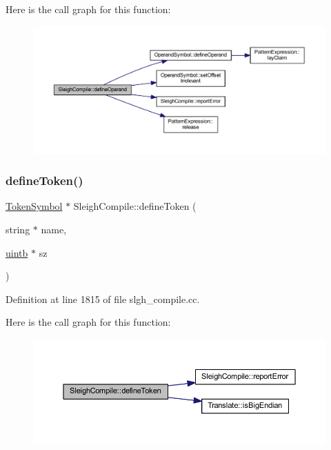 Here is the call graph for this function\+:
\nopagebreak
\begin{figure}[H]
\begin{center}
\leavevmode
\includegraphics[width=350pt]{class_sleigh_compile_a13ca459265a60fa719375491070a378c_cgraph}
\end{center}
\end{figure}
\mbox{\label{class_sleigh_compile_a3853fde5e5b1777fc03c8780ff9bdeaa}} 
\subsubsection{\texorpdfstring{defineToken()}{defineToken()}}
{\footnotesize\ttfamily \mbox{\hyperlink{class_token_symbol}{Token\+Symbol}} $\ast$ Sleigh\+Compile\+::define\+Token (\begin{DoxyParamCaption}\item[{string $\ast$}]{name,  }\item[{\mbox{\hyperlink{types_8h_a2db313c5d32a12b01d26ac9b3bca178f}{uintb}} $\ast$}]{sz }\end{DoxyParamCaption})}



Definition at line 1815 of file slgh\+\_\+compile.\+cc.

Here is the call graph for this function\+:
\nopagebreak
\begin{figure}[H]
\begin{center}
\leavevmode
\includegraphics[width=350pt]{class_sleigh_compile_a3853fde5e5b1777fc03c8780ff9bdeaa_cgraph}
\end{center}
\end{figure}
\mbox{\label{class_sleigh_compile_a97fb4d4cb94d8de8eaba37c0aac16bce}} 
